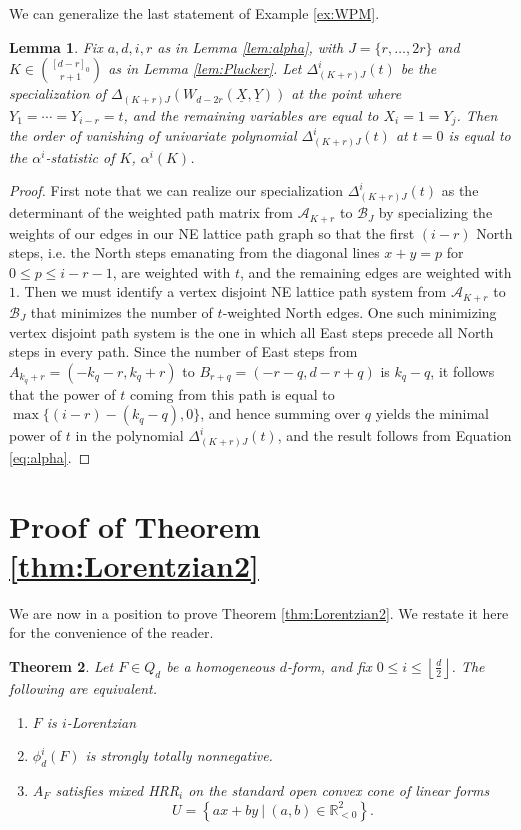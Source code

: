 \documentclass[unnumsec,webpdf,modern,medium]{oup-authoring-template}
\newcommand{\R}{\mathbb{R}}
\newcommand{\flo}[1]{\left\lfloor\frac{#1}{2}\right\rfloor}
\theoremstyle{theorem}
\newtheorem{theorem}{Theorem}[section]
\newtheorem{lemma}[theorem]{Lemma}
\theoremstyle{definition}
\begin{document}
We can generalize the last statement of Example \ref{ex:WPM}.
\begin{lemma}
	\label{lem:Specialization}
	Fix $a,d,i,r$ as in Lemma \ref{lem:alpha}, with $J=\{r,\ldots,2r\}$ and $K\in\binom{[d-r]_0}{r+1}$ as in Lemma \ref{lem:Plucker}.  Let $\Delta^i_{(K+r)J}(t)$ be the specialization of $\Delta_{(K+r)J}\left(W_{d-2r}(\underline{X},\underline{Y})\right)$ at the point where $Y_1=\cdots=Y_{i-r}=t$, and the remaining variables are equal to $X_i=1=Y_j$.  Then the order of vanishing of univariate polynomial $\Delta^i_{(K+r)J}(t)$ at $t=0$ is equal to the $\alpha^i$-statistic of $K$, $\alpha^i(K)$.	 
\end{lemma}
\begin{proof}
	First note that we can realize our specialization $\Delta^i_{(K+r)J}(t)$ as the determinant of the weighted path matrix from $\mathcal{A}_{K+r}$ to $\mathcal{B}_J$ by specializing the weights of our edges in our NE lattice path graph so that the first $(i-r)$ North steps, i.e. the North steps emanating from the diagonal lines $x+y=p$ for $0\leq p\leq i-r-1$, are weighted with $t$, and the remaining edges are weighted with $1$.  Then we must identify a vertex disjoint NE lattice path system from $\mathcal{A}_{K+r}$ to $\mathcal{B}_J$ that minimizes the number of $t$-weighted North edges.  One such minimizing vertex disjoint path system is the one in which all East steps precede all North steps in every path.  Since the number of East steps from $A_{k_q+r}=(-k_q-r,k_q+r)$ to $B_{r+q}=(-r-q,d-r+q)$ is $k_q-q$, it follows that the power of $t$ coming from this path is equal to 
	$\max\{(i-r)-(k_q-q),0\}$, and hence summing over $q$ yields the minimal power of $t$ in the polynomial $\Delta^i_{(K+r)J}(t)$, and the result follows from Equation \eqref{eq:alpha}.	
\end{proof}


\section{Proof of Theorem \ref{thm:Lorentzian2}}
\label{sec:Theorem1}
We are now in a position to prove Theorem \ref{thm:Lorentzian2}.  We restate it here for the convenience of the reader.
\begin{theorem}
	\label{thm:Lorentzian21}
	Let $F\in Q_d$ be a homogeneous $d$-form, and fix $0\leq i\leq \flo{d}$.	The following are equivalent.
	\begin{enumerate}
		\item $F$ is $i$-Lorentzian
		\item $\phi^i_d(F)$ is strongly totally nonnegative.
		\item $A_F$ satisfies mixed HRR$_i$ on the standard open convex cone of linear forms
		$$U=\left\{ax+by \ | \ (a,b)\in\R^2_{<0}\right\}.$$
	\end{enumerate}
\end{theorem} 	
	  
\end{document}
